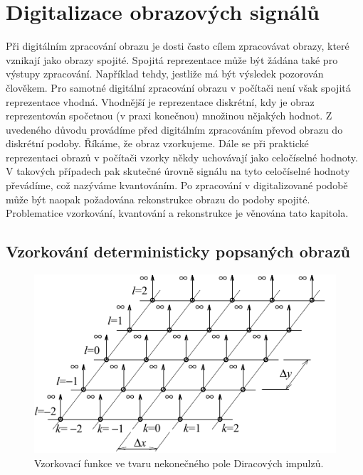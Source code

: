 \chapter*{Digitalizace obrazových signálů}

Při digitálním zpracování obrazu je dosti často cílem zpracovávat obrazy, které vznikají jako obrazy spojité. Spojitá reprezentace může být žádána také pro výstupy zpracování. Například tehdy, jestliže má být výsledek pozorován člověkem. Pro samotné digitální zpracování obrazu v počítači není však spojitá reprezentace vhodná. Vhodnější je reprezentace diskrétní, kdy je obraz reprezentován spočetnou (v praxi konečnou) množinou nějakých hodnot. Z uvedeného důvodu provádíme před digitálním zpracováním převod obrazu do diskrétní podoby. Říkáme, že obraz vzorkujeme. Dále se při praktické reprezentaci obrazů v počítači vzorky někdy uchovávají jako celočíselné hodnoty. V takových případech pak skutečné úrovně signálu na tyto celočíselné hodnoty převádíme, což nazýváme kvantováním. Po zpracování v digitalizované podobě může být naopak požadována rekonstrukce obrazu do podoby spojité. Problematice vzorkování, kvantování a rekonstrukce je věnována tato kapitola.

\section*{Vzorkování deterministicky popsaných obrazů} \label{sec:vzorkovani_deterministicky_popsanych_signalu}

\begin{figure}[th]
    \begin{center}
        \includegraphics[scale=1.0]{04_digitalizace/images/img_4_1.pdf}
    \end{center}
    \caption{Vzorkovací funkce ve tvaru nekonečného pole Diracových impulzů.}
    \label{img:4_1}
\end{figure}

